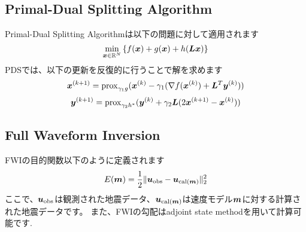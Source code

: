 \subsection{Primal-Dual Splitting Algorithm}\label{subsec:primal-dual-splitting-algorithm}
Primal-Dual Splitting Algorithm\cite{PDS}は以下の問題に対して適用されます
\begin{equation} \label{eq:PDSPrimalEq} \underset{ \bm{x} \in \mathbb{R}^N }{\mathrm{min}} \left\{ f(\bm{x}) + g(\bm{x}) + h(\bm{L} \bm{x}) \right\} \end{equation}
PDSでは、以下の更新を反復的に行うことで解を求めます
\begin{equation} \label{eq:PDSSubStepX} \bm{x}^{(k+1)} = \mathrm{prox}_{\gamma_1 g}(\bm{x}^{(k)} - \gamma_1( \nabla f(\bm{x}^{(k)}) + \bm{L}^T \bm{y}^{(k)} )) \end{equation}
\begin{equation} \label{eq:PDSSubStepY} \bm{y}^{(k+1)} = \mathrm{prox}_{\gamma_2 h^*}(\bm{y}^{(k)} + \gamma_2 \bm{L} (2\bm{x}^{(k+1)} - \bm{x}^{(k)}) ) \end{equation}

\subsection{Full Waveform Inversion}\label{subsec:full-waveform-inversion}

FWIの目的関数以下のように定義されます
\begin{equation} \label{eq:FWIObjective} E(\bm{m}) = \frac {1} {2} \lVert  \bm{u}_{\mathrm{obs}} - \bm{u}_{\mathrm{cal}(\bm{m})}  \rVert _2^2 \end{equation}
ここで、$\bm{u}_{\mathrm{obs}}$は観測された地震データ、$\bm{u}_{\mathrm{cal}(\bm{m})}$は速度モデル$\bm{m}$に対する計算された地震データです。
また、FWIの勾配はadjoint state methodを用いて計算可能です\cite{FWI-gradient}.
